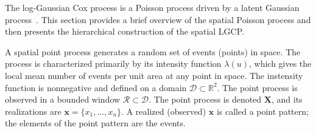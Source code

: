 \documentclass[]{interact}
\begin{document}










The log-Gaussian Cox process is a Poisson process driven by a latent Gaussian
process~\cite{moelleretal}. This section provides a brief overview of the
spatial Poisson process and then presents the hierarchical construction of the
spatial LGCP.

A spatial point process generates a random set of events (points) in space.
The process is characterized primarily by its intensity function
\(\lambda(u)\), which gives the local mean number of events per unit area at
any point in space. The instensity function is nonnegative and defined on a
domain \(\mathcal{D} \subset \mathbb{R}^{2}\). The point process is observed
in a bounded window \(\mathcal{R} \subset \mathcal{D}\). The point process is
denoted \(\mathbf{X}\), and its realizations are \(\mathbf{x} = \{x_{1},
\dots, x_{n}\}\). A realized (observed) \(\mathbf{x}\) is called a point
pattern; the elements of the point pattern are the events.
\end{document}
